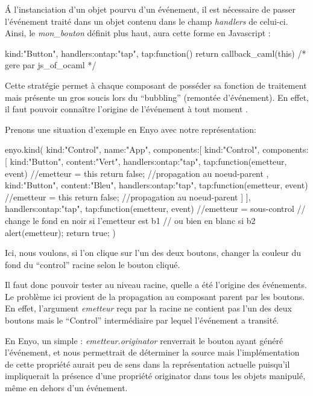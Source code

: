 \documentclass[11pt,a4paper]{report}
\begin{document}
\'A l'instanciation d'un objet pourvu d'un événement, il est nécessaire de passer l'événement traité
dans un objet contenu dans le champ \emph{handlers} de celui-ci. Ainsi, le \emph{mon\_bouton} définit plus haut,
aura cette forme en Javascript :

\begin{JavaScript}
  {kind:"Button", handlers:{ontap:"tap"}, 
    tap:function(){ return callback_caml(this) /* gere par js_of_ocaml */ }}
\end{JavaScript}

Cette stratégie permet à chaque composant de posséder sa fonction de traitement mais présente 
un gros soucis lors du ``bubbling'' (remontée d'événement). En effet, il faut pouvoir connaître l'origine
de l'événement à tout moment .

Prenons une situation d'exemple en Enyo avec notre représentation:
\begin{JavaScript}
enyo.kind({
    kind:"Control",
    name:"App",
    components:[
      {kind:"Control",
        components:[
          {kind:"Button", content:"Vert",         
            handlers:{ontap:"tap"},
            tap:function(emetteur, event){
              //emetteur = this 
              return false; //propagation au noeud-parent
            }
          },
          {kind:"Button", content:"Bleu",         
            handlers:{ontap:"tap"},
            tap:function(emetteur, event){
              //emetteur = this
              return false; //propagation au noeud-parent
            }
          }
        ]
        }
      ],
    handlers:{ontap:"tap"},
    tap:function(emetteur, event){
      //emetteur = sous-control
      // change le fond en noir si l'emetteur est b1
      // ou bien en blanc si b2 
      alert(emetteur);
      return true;
    }
})
\end{JavaScript}

Ici, nous voulons, si l'on clique sur l'un des deux boutons, changer la couleur du fond du
``control'' racine selon le bouton cliqué.

Il faut donc pouvoir tester au niveau racine, quelle a été l'origine des événements.
Le problème ici provient de la propagation au composant parent par les boutons.
En effet, l'argument \emph{emetteur} reçu par la racine ne contient pas l'un des deux boutons
mais le ``Control'' intermédiaire par lequel l'événement a transité.

En Enyo, un simple : \emph{emetteur.originator} renverrait le bouton ayant généré l'événement,
et nous permettrait de déterminer la source mais l'implémentation de cette propriété aurait 
peu de sens dans la représentation actuelle puisqu'il impliquerait la présence d'une propriété
originator dans tous les objets manipulé, même en dehors d'un événement.
\end{document}
